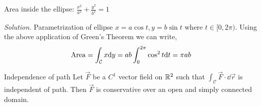 \documentclass[../Analysis-3.tex]{subfiles}
\begin{document}
\begin{Eg}{Area inside the ellipse: $\frac{x^2}{a^2} + \frac{y^2}{b^2} = 1$}{}

  \textit{Solution.} Parametrization of ellipse $x = a \cos t, y = b \sin t$ where $t \in [0,2\pi)$. Using the above application of Green's Theorem we can write,
  \[\operatorname{Area} = \int_{\mathcal{C}} x \dd y = ab \int_{0}^{2\pi} \cos^2t \dd t = \pi ab \]
\end{Eg}

\begin{Thm}{Independence of path}{}
  Let $\vec{F}$ be a $C^1$ vector field on $\mathbb{R}^2$ such that $\displaystyle\int_{\mathcal{C}} \vec{F} \cdot \dd \vec{r}$ is independent of path. Then $\vec{F}$ is conservative over an open and simply connected domain.
\end{Thm}
\end{document}
